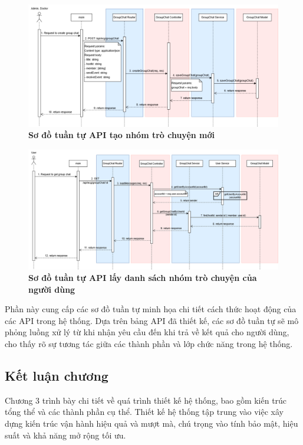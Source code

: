 \begin{figure}[H]
	\centering
	\includegraphics[width=16cm]{Images/api_sequence/chat/createGroupChat.drawio.png}
	\caption[Sơ đồ tuần tự API tạo nhóm trò chuyện mới]{\bfseries \fontsize{12pt}{0pt}\selectfont Sơ đồ tuần tự API tạo nhóm trò chuyện mới}
	\label{sequence_diagram_create_group_chat}
\end{figure}

\begin{figure}[H]
	\centering
	\includegraphics[width=16cm]{Images/api_sequence/chat/getGroupChat.drawio.png}
	\caption[Sơ đồ tuần tự API lấy danh sách nhóm trò chuyện của người dùng]{\bfseries \fontsize{12pt}{0pt}\selectfont Sơ đồ tuần tự API lấy danh sách nhóm trò chuyện của người dùng}
	\label{sequence_diagram_get_group_chat}
\end{figure}
Phần này cung cấp các sơ đồ tuần tự minh họa chi tiết cách thức hoạt động của các API trong hệ thống.
Dựa trên bảng API đã thiết kế, các sơ đồ tuần tự sẽ mô phỏng luồng xử lý từ khi nhận yêu cầu đến khi trả về kết quả cho người dùng,
cho thấy rõ sự tương tác giữa các thành phần và lớp chức năng trong hệ thống.

\subsection{Kết luận chương}

Chương 3 trình bày chi tiết về quá trình thiết kế hệ thống, bao gồm kiến trúc tổng thể và các thành phần cụ thể.
Thiết kế hệ thống tập trung vào việc xây dựng kiến trúc vận hành hiệu quả và mượt mà, chú trọng vào tính bảo mật, hiệu suất và khả năng mở rộng tối ưu.
\newpage